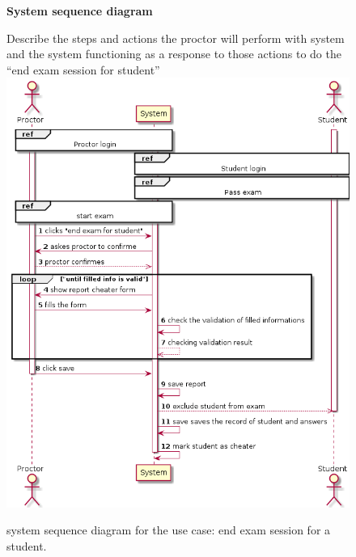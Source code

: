 \documentclass[]{uc2pfecaneva}
\begin{document}
    \begin{figure}[h]
        \raggedright\textbf{System sequence diagram}\linebreak
        \raggedright{Describe the steps and actions the proctor will perform with system and the system functioning
        as a response to those actions to do the “end exam session for student”}
        \linebreak
        \includegraphics[width=\textwidth]{images/End_exam_for_student}
        \caption{system sequence diagram for the use case: end exam session for a student.}
    \end{figure}
    \clearpage
\end{document}
